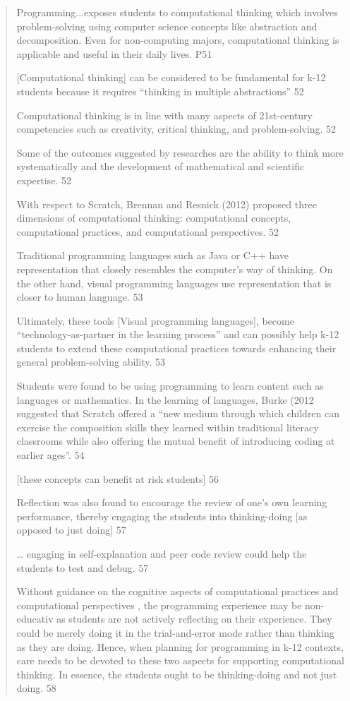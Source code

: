 \documentclass[12pt]{extarticle}
\begin{document}
{\begin{quote}
    Programming...exposes students to computational thinking which involves problem-solving using computer science concepts like abstraction and decomposition. Even for non-computing majors, computational thinking is applicable and useful in their daily lives. P51
    
    [Computational thinking] can be considered to be fundamental for k-12 students because it requires “thinking in multiple abstractions” 52
    
    Computational thinking is in line with many aspects of 21st-century competencies such as creativity, critical thinking, and problem-solving. 52
    
    Some of the outcomes suggested by researches are the ability to think more systematically and the development of mathematical and scientific expertise. 52
    
    With respect to Scratch, Brennan and Resnick (2012) proposed three dimensions of computational thinking: computational concepts, computational practices, and computational perspectives. 52
    
    Traditional programming languages such as Java or C++ have representation that closely resembles the computer’s way of thinking. On the other hand, visual programming languages use representation that is closer to human language. 53
    
    Ultimately, these tools [Visual programming languages],  become “technology-as-partner in the learning process” and can possibly help k-12 students to extend these computational practices towards enhancing their general problem-solving ability. 53
    
    Students were found to be using programming to learn content such as languages or mathematics. In the learning of languages, Burke (2012 suggested that Scratch offered a  “new medium through which children can exercise the composition skills they learned within traditional literacy classrooms while also offering the mutual benefit of introducing coding at earlier ages”. 54
    
    [these concepts can benefit at risk students] 56
    
    Reflection was also found to encourage the review of one’s own learning performance, thereby engaging the students into thinking-doing [as opposed to just doing] 57
    
    … engaging in self-explanation and peer code review could help the students to test and debug. 57
    
    Without guidance on the cognitive aspects of computational practices and computational perspectives , the programming experience may be non-educativ as students are not actively reflecting on their experience. They could be merely doing it in the trial-and-error mode rather than thinking as they are doing. Hence, when planning for programming in k-12 contexts, care needs to be devoted to these two aspects for supporting computational thinking. In essence, the students ought to be thinking-doing and not just doing. 58
\end{quote}

}
\end{document}
